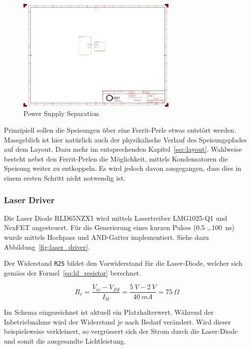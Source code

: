 \begin{figure}[H]
    \centering
    \includegraphics[page=2, trim=260 90 640 550, clip, width=0.7\textwidth]{attachments/schematic.pdf}
    \caption{Power Supply Separation}\label{fig:power_supply_separation}
\end{figure}

Prinzipiell sollen die Speisungen über eine Ferrit-Perle etwas entstört werden. Massgeblich ist hier natürlich auch der
physikalische Verlauf des Speisungspfades auf dem Layout. Dazu mehr im entsprechenden Kapitel~\ref{sec:layout}. Wahlweise
besteht nebst den Ferrit-Perlen die Möglichkeit, mittels Kondensatoren die Speisung weiter zu entkoppeln. Es wird jedoch
davon ausgegangen, dass dies in einem ersten Schritt nicht notwendig ist.

\subsubsection{Laser Driver}\label{sec:schematic_laser_driver}

Die Laser Diode RLD65NZX1 \cite{rohm2019rld65nzx1_datasheet} wird mittels Lasertreiber LMG1025-Q1 \cite{ti2024lmg1025q1_datasheet}
und NexFET \cite{ti2016csd17578q3a_datasheet} angesteuert. Für die Generierung eines kurzen Pulses (0.5 \dots 100~ns)
wurde mittels Hochpass und AND-Gatter \cite{diodes202074lvc1g08q_datasheet} implementiert. Siehe dazu Abbildung~\ref{fig:laser_driver}.

Der Widerstand \lstinline|R25| bildet den Vorwiderstand für die Laser-Diode, welcher sich gemäss der Formel~\ref{eq:ld_resistor} berechnet.

\begin{equation}\label{eq:ld_resistor}
    R_{v} = \frac{V_{cc} - V_{fld}}{I_{ld}} = \frac{5~V - 2~V}{40~mA} = 75~\Omega
\end{equation}

Im Schema eingezeichnet ist aktuell ein Platzhalterwert. Während der Inbetriebnahme wird der Widerstand je nach Bedarf
verändert. Wird dieser beispielsweise verkleinert, so vergrössert sich der Strom durch die Laser-Diode und somit die ausgesandte
Lichtleistung.

